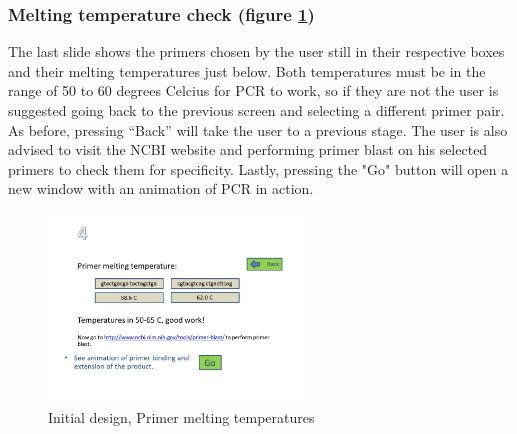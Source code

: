 \subsubsection{Melting temperature check (figure \ref{fig:UiDes:slide6})}
The last slide shows the primers chosen by the user still in their
respective boxes and their melting temperatures just below.
Both temperatures must be in the range of 50 to 60 degrees Celcius for
PCR to work, so if they are not the user is suggested going back to
the previous screen and selecting a different primer pair.
As before, pressing ``Back'' will take the user to a previous stage.
The user is also advised to visit the NCBI website \cite{ncbi} and
performing primer blast on his selected primers to check them for
specificity. Lastly, pressing the "Go" button will open a new window
with an animation of PCR in action.

\begin{figure}[h]
  \begin{center}
	\includegraphics[width=0.6\textwidth]{./images/UiDes/Slide6.JPG}
    \caption{
      \label{fig:UiDes:slide6}
      Initial design, Primer melting temperatures
    }
  \end{center}
\end{figure}

